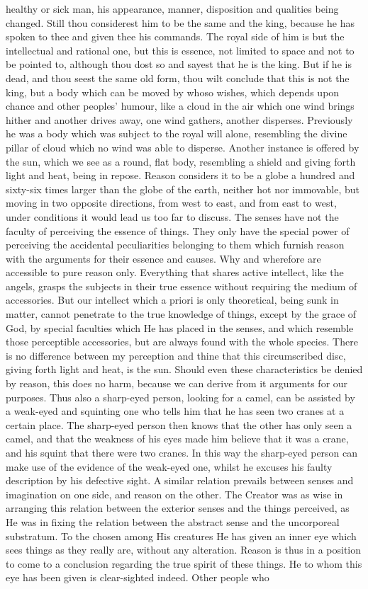 \documentclass[12pt]{article}
\begin{document}
healthy or sick man, his appearance, manner, disposition and qualities being changed. Still thou considerest him to be the same and the king, because he has spoken to thee and given thee his commands. The royal side of him is but the intellectual and rational one, but this is essence, not limited to space and not to be pointed to, although thou dost so and sayest that he is the king. But if he is dead, and thou seest the same old form, thou wilt conclude that this is not the king, but a body which can be moved by whoso wishes, which depends upon chance and other peoples’ humour, like a cloud in the air which one wind brings hither and another drives away, one wind gathers, another disperses. Previously he was a body which was subject to the royal will alone, resembling the divine pillar of cloud which no wind was able to disperse. Another instance is offered by the sun, which we see as a round, flat body, resembling a shield and giving forth light and heat, being in repose. Reason considers it to be a globe a hundred and sixty-six times larger than the globe of the earth, neither hot nor immovable, but moving in two opposite directions, from west to east, and from east to west, under conditions it would lead us too far to discuss. The senses have not the faculty of perceiving the essence of things. They only have the special power of perceiving the accidental peculiarities belonging to them which furnish reason with the arguments for their essence and causes. Why and wherefore are accessible to pure reason only. Everything that shares active intellect, like the angels, grasps the subjects in their true essence without requiring the medium of accessories. But our intellect which a priori is only theoretical, being sunk in matter, cannot penetrate to the true knowledge of things, except by the grace of God, by special faculties which He has placed in the senses, and which resemble those perceptible accessories, but are always found with the whole species. There is no difference between my perception and thine that this circumscribed disc, giving forth light and heat, is the sun. Should even these characteristics be denied by reason, this does no harm, because we can derive from it arguments for our purposes. Thus also a sharp-eyed person, looking for a camel, can be assisted by a weak-eyed and squinting one who tells him that he has seen two cranes at a certain place. The sharp-eyed person then knows that the other has only seen a camel, and that the weakness of his eyes made him believe that it was a crane, and his squint that there were two cranes. In this way the sharp-eyed person can make use of the evidence of the weak-eyed one, whilst he excuses his faulty description by his defective sight. A similar relation prevails between senses and imagination on one side, and reason on the other. The Creator was as wise in arranging this relation between the exterior senses and the things perceived, as He was in fixing the relation between the abstract sense and the uncorporeal substratum. To the chosen among His creatures He has given an inner eye which sees things as they really are, without any alteration. Reason is thus in a position to come to a conclusion regarding the true spirit of these things. He to whom this eye has been given is clear-sighted indeed. Other people who 
\end{document}
